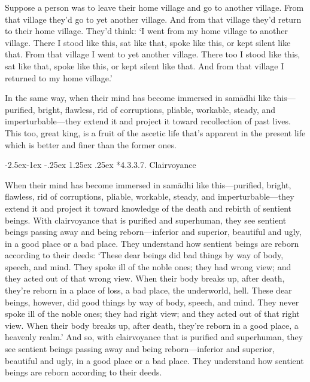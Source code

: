 \documentclass[12pt,openany]{book}%
\makeatletter
\renewcommand\paragraph{\@startsection{paragraph}{4}{\z@}%
            {-2.5ex\@plus -1ex \@minus -.25ex}%
            {1.25ex \@plus .25ex}%
            {\noindent\Semiboldnormalfont\normalsize}}
\makeatother
\begin{document}
Suppose a person was to leave their home village and go to another village. From that village they’d go to yet another village. And from that village they’d return to their home village. They’d think: ‘I went from my home village to another village. There I stood like this, sat like that, spoke like this, or kept silent like that. From that village I went to yet another village. There too I stood like this, sat like that, spoke like this, or kept silent like that. And from that village I returned to my home village.’ 

In the same way, when their mind has become immersed in \textsanskrit{samādhi} like this—purified, bright, flawless, rid of corruptions, pliable, workable, steady, and imperturbable—they extend it and project it toward recollection of past lives. This too, great king, is a fruit of the ascetic life that’s apparent in the present life which is better and finer than the former ones. 

\paragraph*{4.3.3.7. Clairvoyance }

When their mind has become immersed in \textsanskrit{samādhi} like this—purified, bright, flawless, rid of corruptions, pliable, workable, steady, and imperturbable—they extend it and project it toward knowledge of the death and rebirth of sentient beings. With clairvoyance that is purified and superhuman, they see sentient beings passing away and being reborn—inferior and superior, beautiful and ugly, in a good place or a bad place. They understand how sentient beings are reborn according to their deeds: ‘These dear beings did bad things by way of body, speech, and mind. They spoke ill of the noble ones; they had wrong view; and they acted out of that wrong view. When their body breaks up, after death, they’re reborn in a place of loss, a bad place, the underworld, hell. These dear beings, however, did good things by way of body, speech, and mind. They never spoke ill of the noble ones; they had right view; and they acted out of that right view. When their body breaks up, after death, they’re reborn in a good place, a heavenly realm.’ And so, with clairvoyance that is purified and superhuman, they see sentient beings passing away and being reborn—inferior and superior, beautiful and ugly, in a good place or a bad place. They understand how sentient beings are reborn according to their deeds. 
\end{document}
